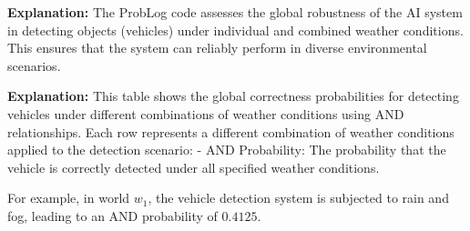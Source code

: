 \textbf{Explanation:} The ProbLog code assesses the global robustness of the AI system in detecting objects (vehicles) under individual and combined weather conditions. This ensures that the system can reliably perform in diverse environmental scenarios.

\begin{table}[h]
  \centering
  \caption{Specification Probabilities (AND) for Vehicle Detection Under Different Weather Conditions \\
  \( P(A \cap B \cap C) = P(A) \times P(B) \times P(C) \)}
  \label{tab:veh_prob_and}
\end{table}

\textbf{Explanation:} This table shows the global correctness probabilities for detecting vehicles under different combinations of weather conditions using AND relationships. Each row represents a different combination of weather conditions applied to the detection scenario:
- AND Probability: The probability that the vehicle is correctly detected under all specified weather conditions.

For example, in world $w_1$, the vehicle detection system is subjected to rain and fog, leading to an AND probability of $0.4125$.

